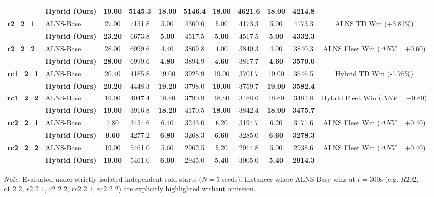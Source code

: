 \documentclass{article}
\begin{document}
\begin{table}[!htbp]
\begin{tabular*}{\textwidth}{@{\extracolsep{\fill}} ll cccccc cc c @{}}
 & \textbf{Hybrid (Ours)} & \textbf{19.00} & 5145.3 & \textbf{18.00} & 5146.4 & \textbf{18.00} & 4621.6 & \textbf{18.00} & \textbf{4214.8} & \\
\midrule
\multirow{2}{*}{\textbf{r2\_2\_1}} & ALNS-Base & 27.00 & 7151.8 & 5.00 & 4300.6 & 5.00 & 4173.3 & 5.00 & 4173.3 & \multirow{2}{*}{ALNS TD Win (+3.81\%)} \\
 & \textbf{Hybrid (Ours)} & \textbf{23.20} & 6673.8 & \textbf{5.00} & 4517.5 & \textbf{5.00} & 4517.5 & \textbf{5.00} & \textbf{4332.3} & \\
\midrule
\multirow{2}{*}{\textbf{r2\_2\_2}} & ALNS-Base & 28.00 & 6999.6 & 4.40 & 3809.8 & 4.00 & 3840.3 & 4.00 & 3840.3 & \multirow{2}{*}{ALNS Fleet Win ($\Delta NV=+0.60$)} \\
 & \textbf{Hybrid (Ours)} & \textbf{28.00} & 6999.6 & \textbf{4.80} & 3894.9 & \textbf{4.60} & 3817.7 & \textbf{4.60} & \textbf{3570.0} & \\
\midrule
\multirow{2}{*}{\textbf{rc1\_2\_1}} & ALNS-Base & 20.40 & 4185.8 & 19.00 & 3925.9 & 19.00 & 3701.7 & 19.00 & 3646.5 & \multirow{2}{*}{Hybrid TD Win (-1.76\%)} \\
 & \textbf{Hybrid (Ours)} & \textbf{20.20} & 4448.3 & \textbf{19.20} & 3798.0 & \textbf{19.00} & 3759.7 & \textbf{19.00} & \textbf{3582.4} & \\
\midrule
\multirow{2}{*}{\textbf{rc1\_2\_2}} & ALNS-Base & 19.00 & 4047.4 & 18.80 & 3790.9 & 18.80 & 3488.6 & 18.80 & 3482.8 & \multirow{2}{*}{Hybrid Fleet Win ($\Delta NV=-0.80$)} \\
 & \textbf{Hybrid (Ours)} & \textbf{19.00} & 3916.8 & \textbf{18.20} & 4170.5 & \textbf{18.00} & 3842.4 & \textbf{18.00} & \textbf{3475.7} & \\
\midrule
\multirow{2}{*}{\textbf{rc2\_2\_1}} & ALNS-Base & 7.80 & 3454.6 & 6.40 & 3243.0 & 6.20 & 3194.7 & 6.20 & 3171.6 & \multirow{2}{*}{ALNS Fleet Win ($\Delta NV=+0.40$)} \\
 & \textbf{Hybrid (Ours)} & \textbf{9.60} & 4277.2 & \textbf{6.80} & 3268.3 & \textbf{6.60} & 3285.0 & \textbf{6.60} & \textbf{3278.3} & \\
\midrule
\multirow{2}{*}{\textbf{rc2\_2\_2}} & ALNS-Base & 19.00 & 5461.0 & 5.60 & 2962.5 & 5.20 & 2914.8 & 5.00 & 2938.6 & \multirow{2}{*}{ALNS Fleet Win ($\Delta NV=+0.40$)} \\
 & \textbf{Hybrid (Ours)} & \textbf{19.00} & 5461.0 & \textbf{6.00} & 2945.0 & \textbf{5.40} & 3005.0 & \textbf{5.40} & \textbf{2914.3} & \\
\bottomrule
\end{tabular*}
{\raggedright \scriptsize \textit{Note}: Evaluated under strictly isolated independent cold-starts ($N=5$ seeds). Instances where ALNS-Base wins at $t=300\text{s}$ (e.g. $R202$, $c1\_2\_2$, $r2\_2\_1$, $r2\_2\_2$, $rc2\_2\_1$, $rc2\_2\_2$) are explicitly highlighted without omission.\par}
\end{table}
\end{document}
